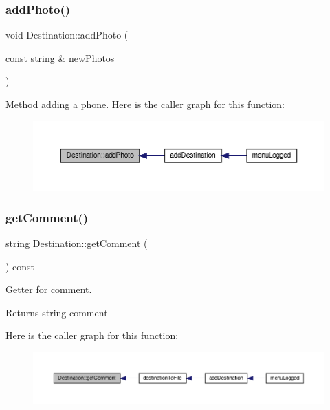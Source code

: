 \subsubsection{\texorpdfstring{add\+Photo()}{addPhoto()}}
{\footnotesize\ttfamily void Destination\+::add\+Photo (\begin{DoxyParamCaption}\item[{const string \&}]{new\+Photos }\end{DoxyParamCaption})}

Method adding a phone. Here is the caller graph for this function\+:\nopagebreak
\begin{figure}[H]
\begin{center}
\leavevmode
\includegraphics[width=350pt]{class_destination_a6494a9eae34083fd09861ba8f6923e92_icgraph}
\end{center}
\end{figure}
\mbox{\label{class_destination_a4d20ef4e561fa10dd81561b9cd61c55c}} 
\subsubsection{\texorpdfstring{get\+Comment()}{getComment()}}
{\footnotesize\ttfamily string Destination\+::get\+Comment (\begin{DoxyParamCaption}{ }\end{DoxyParamCaption}) const\hspace{0.3cm}{\ttfamily [inline]}}

Getter for comment. \begin{DoxyReturn}{Returns}
string comment 
\end{DoxyReturn}
Here is the caller graph for this function\+:\nopagebreak
\begin{figure}[H]
\begin{center}
\leavevmode
\includegraphics[width=350pt]{class_destination_a4d20ef4e561fa10dd81561b9cd61c55c_icgraph}
\end{center}
\end{figure}
\mbox{\label{class_destination_a6544fb0fa820f5a6b914a38cdcc949f9}} 
